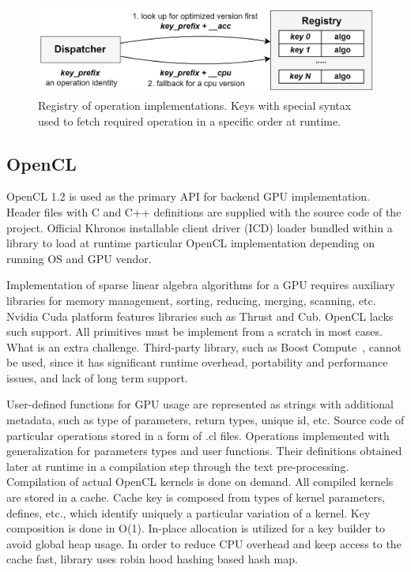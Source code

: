\begin{figure}[]
\centering
\includegraphics[width=0.95\linewidth]{figures/registry.png}
\caption{Registry of operation implementations. Keys with special syntax used to fetch required operation in a specific order at runtime.}
\label{fig:reg}
\end{figure}

\subsection{OpenCL}

OpenCL 1.2 is used as the primary API for backend GPU implementation. Header files with C and C++ definitions are supplied with the source code of the project. Official Khronos installable client driver (ICD) loader bundled within a library to load at runtime particular OpenCL implementation depending on running OS and GPU vendor. 

Implementation of sparse linear algebra algorithms for a GPU requires auxiliary libraries for memory management, sorting, reducing, merging, scanning, etc. 
Nvidia Cuda platform features libraries such as Thrust and Cub.  
OpenCL lacks such support. All primitives must be implement from a scratch in most cases. What is an extra challenge. Third-party library, such as Boost Compute~\cite{10.1145/2909437.2909454:boost:compute}, cannot be used, since it has significant runtime overhead, portability and performance issues, and lack of long term support.

User-defined functions for GPU usage are represented as strings with additional metadata, such as type of parameters, return types, unique id, etc. 
Source code of particular operations stored in a form of .cl files. 
Operations implemented with generalization for parameters types and user functions. 
Their definitions obtained later at runtime in a compilation step through the text pre-processing.
Compilation of actual OpenCL kernels is done on demand. 
All compiled kernels are stored in a cache. Cache key is composed from types of kernel parameters, defines, etc., which identify uniquely a particular variation of a kernel. 
Key composition is done in O(1). In-place allocation is utilized for a key builder to avoid global heap usage. 
In order to reduce CPU overhead and keep access to the cache fast, library uses robin hood hashing based hash map. 

